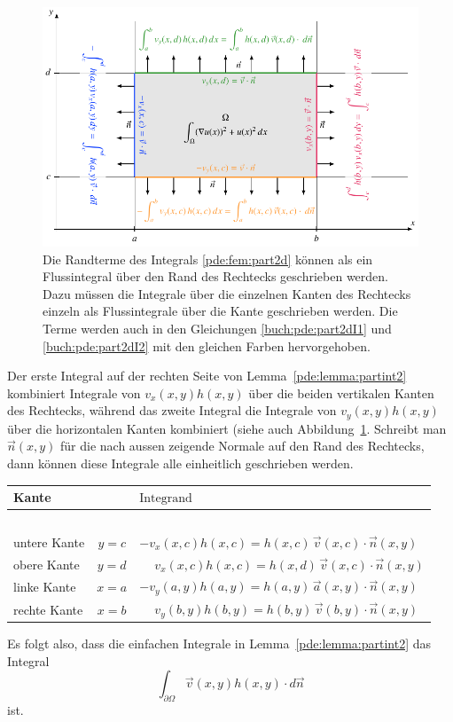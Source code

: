 \begin{figure}
\centering
\includegraphics{chapters/70-pde/images/2dpart.pdf}
\caption{Die Randterme des Integrals \eqref{pde:fem:part2d}  können
als ein Flussintegral über den Rand des Rechtecks geschrieben werden.
Dazu müssen die Integrale über die einzelnen Kanten des Rechtecks einzeln
als Flussintegrale über die Kante geschrieben werden.
Die Terme werden auch in den Gleichungen
\eqref{buch:pde:part2dI1} und \eqref{buch:pde:part2dI2}
mit den gleichen Farben hervorgehoben.
\label{buch:pde:pfadintegral}}
\end{figure}
Der erste Integral auf der rechten Seite von Lemma~\ref{pde:lemma:partint2}
kombiniert Integrale von $v_x(x,y) h(x,y)$ über die beiden vertikalen Kanten 
des Rechtecks, während das zweite Integral die Integrale von
$v_y(x,y)h(x,y)$ über die horizontalen Kanten kombiniert (siehe auch
Abbildung~\ref{buch:pde:pfadintegral}.
Schreibt man $\vec{n}(x,y)$ für die nach aussen zeigende Normale auf den Rand 
des Rechtecks, dann können diese Integrale alle einheitlich geschrieben
werden.
\begin{center}
\begin{tabular}{l >{$}c<{$} >{$}l<{$}}
Kante& &\text{Integrand}
\\[2pt]
\hline
\\[-7pt]
\color{orange}untere Kante
	&y=c
	&         - v_x(x,c)h(x,c) = h(x,c) \, \vec{v}(x,c) \cdot \vec{n}(x,y)
\\[4pt]
\color{gruen}obere Kante
	&y=d
	&\phantom{-}v_x(x,c)h(x,c) = h(x,d) \, \vec{v}(x,c) \cdot \vec{n}(x,y)
\\[4pt]
\color{azure}linke Kante
	&x=a
	&         - v_y(a,y)h(a,y) = h(a,y) \, \vec{a}(x,y) \cdot \vec{n}(x,y)
\\[4pt]
\color{magenta}rechte Kante
	&x=b
 	&\phantom{-}v_y(b,y)h(b,y) = h(b,y) \, \vec{v}(b,y) \cdot \vec{n}(x,y)
\\[4pt]
\hline
\end{tabular}
\end{center}
Es folgt also, dass die einfachen Integrale in 
Lemma~\ref{pde:lemma:partint2} das Integral
\[
\int_{\partial\Omega} \vec{v}(x,y) h(x,y) \cdot d\vec{n}
\]
ist.

